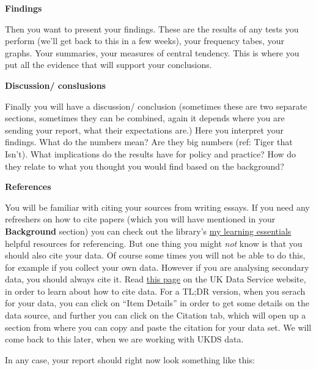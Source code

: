 \documentclass[]{book}
\theoremstyle{definition}
\theoremstyle{definition}
\theoremstyle{definition}
\theoremstyle{remark}
\begin{document}
\textbf{Findings}

Then you want to present your findings. These are the results of any
tests you perform (we'll get back to this in a few weeks), your
frequency tabes, your graphs. Your summaries, your measures of central
tendency. This is where you put all the evidence that will support your
conclusions.

\textbf{Discussion/ conslusions}

Finally you will have a discussion/ conclusion (sometimes these are two
separate sections, sometimes they can be combined, again it depends
where you are sending your report, what their expectations are.) Here
you interpret your findings. What do the numbers mean? Are they big
numbers (ref: Tiger that Isn't). What implications do the results have
for policy and practice? How do they relate to what you thought you
would find based on the background?

\textbf{References}

You will be familiar with citing your sources from writing essays. If
you need any refreshers on how to cite papers (which you will have
mentioned in your \textbf{Background} section) you can check out the
library's
\href{http://www.library.manchester.ac.uk/using-the-library/students/training-and-skills-support/my-learning-essentials/online-resources/?level=3\&level1Link=2\&level2Links=referencing,}{my
learning essentials} helpful resources for referencing. But one thing
you might \emph{not} know is that you should also cite your data. Of
course some times you will not be able to do this, for example if you
collect your own data. However if you are analysing secondary data, you
should always cite it. Read
\href{https://www.ukdataservice.ac.uk/use-data/citing-data}{this page}
on the UK Data Service website, in order to learn about how to cite
data. For a TL;DR version, when you serach for your data, you can click
on ``Item Details'' in order to get some details on the data source, and
further you can click on the Citation tab, which will open up a section
from where you can copy and paste the citation for your data set. We
will come back to this later, when we are working with UKDS data.

In any case, your report should right now look something like this:
\end{document}

